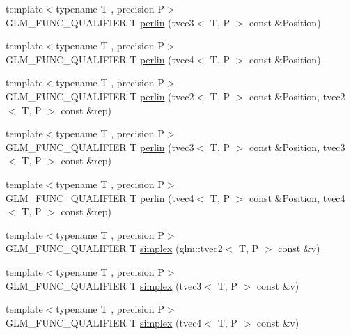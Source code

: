 \begin{DoxyCompactItemize}
\item 
{\footnotesize template$<$typename T , precision P$>$ }\\G\+L\+M\+\_\+\+F\+U\+N\+C\+\_\+\+Q\+U\+A\+L\+I\+F\+I\+E\+R T \hyperlink{namespaceglm_a86c5aa2c23b2d0f62d3399ac024bc089}{perlin} (tvec3$<$ T, P $>$ const \&Position)
\item 
{\footnotesize template$<$typename T , precision P$>$ }\\G\+L\+M\+\_\+\+F\+U\+N\+C\+\_\+\+Q\+U\+A\+L\+I\+F\+I\+E\+R T \hyperlink{namespaceglm_accc072c37eff6ab426b7138d0bd1765f}{perlin} (tvec4$<$ T, P $>$ const \&Position)
\item 
{\footnotesize template$<$typename T , precision P$>$ }\\G\+L\+M\+\_\+\+F\+U\+N\+C\+\_\+\+Q\+U\+A\+L\+I\+F\+I\+E\+R T \hyperlink{namespaceglm_aa51d7040ecd2773574a520a4bd41f680}{perlin} (tvec2$<$ T, P $>$ const \&Position, tvec2$<$ T, P $>$ const \&rep)
\item 
{\footnotesize template$<$typename T , precision P$>$ }\\G\+L\+M\+\_\+\+F\+U\+N\+C\+\_\+\+Q\+U\+A\+L\+I\+F\+I\+E\+R T \hyperlink{namespaceglm_add9522a1426ca2f1499daf7603500269}{perlin} (tvec3$<$ T, P $>$ const \&Position, tvec3$<$ T, P $>$ const \&rep)
\item 
{\footnotesize template$<$typename T , precision P$>$ }\\G\+L\+M\+\_\+\+F\+U\+N\+C\+\_\+\+Q\+U\+A\+L\+I\+F\+I\+E\+R T \hyperlink{namespaceglm_aac7a6a7b23c4852eb1024f5b9564142f}{perlin} (tvec4$<$ T, P $>$ const \&Position, tvec4$<$ T, P $>$ const \&rep)
\item 
{\footnotesize template$<$typename T , precision P$>$ }\\G\+L\+M\+\_\+\+F\+U\+N\+C\+\_\+\+Q\+U\+A\+L\+I\+F\+I\+E\+R T \hyperlink{namespaceglm_afdd43ecc519f98c7550e8850c030f1a8}{simplex} (glm\+::tvec2$<$ T, P $>$ const \&v)
\item 
{\footnotesize template$<$typename T , precision P$>$ }\\G\+L\+M\+\_\+\+F\+U\+N\+C\+\_\+\+Q\+U\+A\+L\+I\+F\+I\+E\+R T \hyperlink{namespaceglm_ad251ced23dfd0c991b7e06b5a398dfe5}{simplex} (tvec3$<$ T, P $>$ const \&v)
\item 
{\footnotesize template$<$typename T , precision P$>$ }\\G\+L\+M\+\_\+\+F\+U\+N\+C\+\_\+\+Q\+U\+A\+L\+I\+F\+I\+E\+R T \hyperlink{namespaceglm_a302e8f4466cd88ebd9581e67c8368254}{simplex} (tvec4$<$ T, P $>$ const \&v)
\item 

\end{DoxyCompactItemize}
